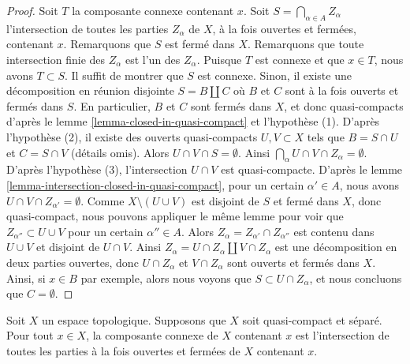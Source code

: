 \begin{proof}
Soit $T$ la composante connexe contenant $x$.
Soit $S = \bigcap_{\alpha \in A} Z_\alpha$ l'intersection de toutes les
parties $Z_\alpha$ de $X$, à la fois ouvertes et fermées, contenant $x$.
Remarquons que $S$ est fermé dans $X$.
Remarquons que toute intersection finie des $Z_\alpha$ est l'un des $Z_\alpha$.
Puisque $T$ est connexe et que $x \in T$, nous avons $T \subset S$.
Il suffit de montrer que $S$ est connexe.
Sinon, il existe une décomposition en réunion disjointe
$S = B \amalg C$ où $B$ et $C$ sont à la fois ouverts et fermés dans $S$.
En particulier, $B$ et $C$ sont fermés dans $X$, et donc quasi-compacts d'après le
lemme \ref{lemma-closed-in-quasi-compact} et l'hypothèse (1).
D'après l'hypothèse (2), il existe des ouverts quasi-compacts
$U, V \subset X$ tels que $B = S \cap U$ et $C = S \cap V$ (détails omis).
Alors $U \cap V \cap S = \emptyset$.
Ainsi $\bigcap_\alpha U \cap V \cap Z_\alpha = \emptyset$.
D'après l'hypothèse (3), l'intersection $U \cap V$ est quasi-compacte.
D'après le lemme \ref{lemma-intersection-closed-in-quasi-compact},
pour un certain $\alpha' \in A$, nous avons $U \cap V \cap Z_{\alpha'} = \emptyset$.
Comme $X \setminus (U \cup V)$ est disjoint de $S$
et fermé dans $X$, donc quasi-compact, nous pouvons appliquer le même lemme
pour voir que $Z_{\alpha''} \subset U \cup V$ pour un certain $\alpha'' \in A$.
Alors $Z_\alpha = Z_{\alpha'} \cap Z_{\alpha''}$ est contenu
dans $U \cup V$ et disjoint de $U \cap V$.
Ainsi $Z_\alpha = U \cap Z_\alpha \amalg V \cap Z_\alpha$
est une décomposition en deux parties ouvertes,
donc $U \cap Z_\alpha$ et $V \cap Z_\alpha$ sont ouverts et fermés dans $X$.
Ainsi, si $x \in B$ par exemple, alors nous voyons que $S \subset U \cap Z_\alpha$,
et nous concluons que $C = \emptyset$.
\end{proof}

\begin{lemma}
\label{lemma-connected-component-intersection-compact-Hausdorff}
Soit $X$ un espace topologique. Supposons que $X$ soit quasi-compact et séparé.
Pour tout $x \in X$, la composante connexe de $X$ contenant
$x$ est l'intersection de toutes les parties à la fois ouvertes et fermées
de $X$ contenant $x$.
\end{lemma}

